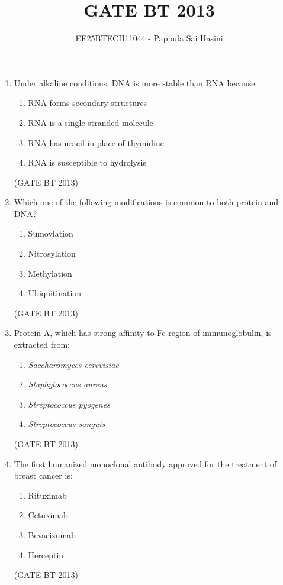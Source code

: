 \documentclass[journal,12pt,onecolumn]{IEEEtran}
\theoremstyle{remark}
\begin{document}
\title{GATE BT 2013}
\author{EE25BTECH11044 - Pappula Sai Hasini}
\maketitle
\renewcommand{\thefigure}{\theenumi}
\renewcommand{\thetable}{\theenumi}
\begin{enumerate}
    \item 


Under alkaline conditions, DNA is more stable than RNA because:

\begin{enumerate}[label=(\Alph*)]
    \item RNA forms secondary structures
    \item RNA is a single stranded molecule
    \item RNA has uracil in place of thymidine
    \item RNA is susceptible to hydrolysis
\end{enumerate} 
\hfill (GATE BT 2013)

\item Which one of the following modifications is common to both protein and DNA?

\begin{enumerate}[label=(\Alph*)]
    \item Sumoylation
    \item Nitrosylation
    \item Methylation
    \item Ubiquitination
\end{enumerate} 
\hfill (GATE BT 2013)

\item Protein A, which has strong affinity to Fc region of immunoglobulin, is extracted from:

\begin{enumerate}[label=(\Alph*)]
    \item \textit{Saccharomyces cerevisiae}
    \item \textit{Staphylococcus aureus}
    \item \textit{Streptococcus pyogenes}
    \item \textit{Streptococcus sanguis}
\end{enumerate}
\hfill (GATE BT 2013)

\item The first humanized monoclonal antibody approved for the treatment of breast cancer is:

\begin{enumerate}[label=(\Alph*)]
    \item Rituximab
    \item Cetuximab
    \item Bevacizumab
    \item Herceptin
\end{enumerate} 
\hfill (GATE BT 2013)


\end{enumerate}
\end{document}
